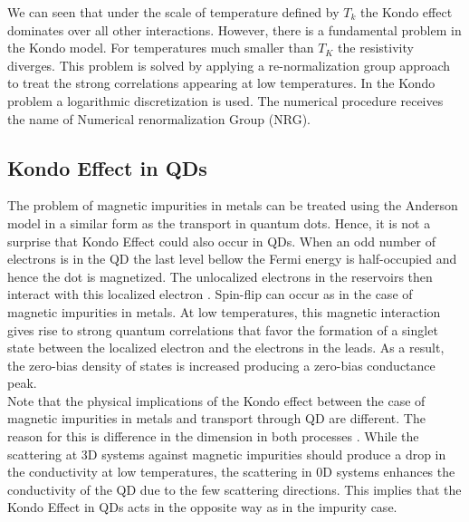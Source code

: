 We can seen that under the scale of temperature defined by $T_k$ the Kondo effect dominates over all other interactions. However, there is a fundamental problem in the Kondo model. For temperatures much smaller than $T_K$ the resistivity diverges. This problem is solved by applying a re-normalization group approach to treat the strong correlations appearing at low temperatures. In the Kondo problem a logarithmic discretization is used. The numerical procedure receives the name of Numerical renormalization Group (NRG). 


\subsection{Kondo Effect in QDs}


The problem of magnetic impurities in metals can be treated using the Anderson model in a similar form as the transport
 in quantum dots. Hence, it is not a surprise that Kondo Effect could also occur in QDs. When an odd number of electrons is in the QD the last level bellow the Fermi energy is half-occupied and hence the dot is magnetized. The unlocalized electrons in the reservoirs then interact with this localized electron . Spin-flip can occur as in the case of  magnetic impurities in metals. At low temperatures, this magnetic  interaction gives rise to strong quantum correlations that favor the formation of a singlet state between the localized electron and the electrons in the leads. As a result, the zero-bias density of states is increased producing a zero-bias conductance peak. \\

Note that the physical implications of the Kondo effect  between the case of magnetic impurities in metals and transport through QD are different. The reason for this is difference in the dimension in both processes . While the scattering at 3D systems against magnetic impurities should produce a drop in the conductivity at low temperatures, the scattering in 0D systems enhances the conductivity of the QD due to the few scattering directions. This implies that the Kondo Effect in QDs acts in the opposite way as in the impurity case. 




















